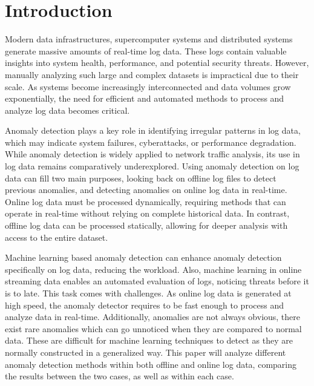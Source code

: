 


\chapter{Introduction}
\label{cha:introduction}
Modern data infrastructures, supercomputer systems and distributed systems generate massive amounts of real-time log data. These logs contain valuable insights into system health, performance, and potential security threats. However, manually analyzing such large and complex datasets is impractical due to their scale. As systems become increasingly interconnected and data volumes grow exponentially, the need for efficient and automated methods to process and analyze log data becomes critical.

Anomaly detection plays a key role in identifying irregular patterns in log data, which may indicate system failures, cyberattacks, or performance degradation. While anomaly detection is widely applied to network traffic analysis, its use in log data remains comparatively underexplored. Using anomaly detection on log data can fill two main purposes, looking back on offline log files to detect previous anomalies, and detecting anomalies on online log data in real-time. Online log data must be processed dynamically, requiring methods that can operate in real-time without relying on complete historical data. In contrast, offline log data can be processed statically, allowing for deeper analysis with access to the entire dataset.

 Machine learning based anomaly detection can enhance anomaly detection specifically on log data, reducing the workload. Also, machine learning in online streaming data enables an automated evaluation of logs, noticing threats before it is to late. This task comes with challenges. As online log data is generated at high speed, the anomaly detector requires to be fast enough to process and analyze data in real-time. Additionally, anomalies are not always obvious, there exist rare anomalies which can go unnoticed when they are compared to normal data. These are difficult for machine learning techniques to detect as they are normally constructed in a generalized way. This paper will analyze different anomaly detection methods within both offline and online log data, comparing the results between the two cases, as well as within each case. 

